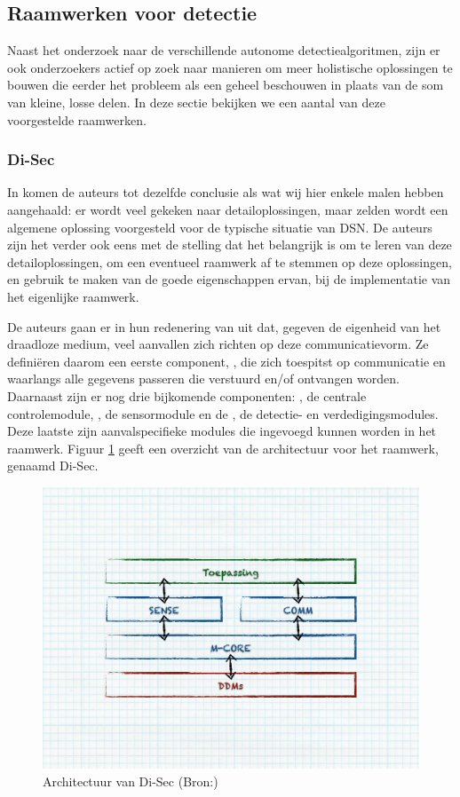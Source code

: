 
\subsection{Raamwerken voor detectie}
\label{subsection:frameworks}

Naast het onderzoek naar de verschillende autonome detectiealgoritmen, zijn er
ook onderzoekers actief op zoek naar manieren om meer holistische oplossingen
te bouwen die eerder het probleem als een geheel beschouwen in plaats van de
som van kleine, losse delen. In deze sectie bekijken we een aantal van deze
voorgestelde raamwerken.

\subsubsection*{Di-Sec}
\label{subsubsection:di-sec}

In \citep{valero2012di} komen de auteurs tot dezelfde conclusie als wat wij
hier enkele malen hebben aangehaald: er wordt veel gekeken naar
detailoplossingen, maar zelden wordt een algemene oplossing voorgesteld voor de
typische situatie van DSN. De auteurs zijn het verder ook eens met de stelling
dat het belangrijk is om te leren van deze detailoplossingen, om een eventueel
raamwerk af te stemmen op deze oplossingen, en gebruik te maken van de goede
eigenschappen ervan, bij de implementatie van het eigenlijke raamwerk.

De auteurs gaan er in hun redenering van uit dat, gegeven de eigenheid van het
draadloze medium, veel aanvallen zich richten op deze communicatievorm. Ze
defini\"eren daarom een eerste component, , die zich toespitst op
communicatie en waarlangs alle gegevens passeren die verstuurd en/of ontvangen
worden. Daarnaast zijn er nog drie bijkomende componenten: , de
centrale controlemodule, , de sensormodule en de , de
detectie- en verdedigingsmodules. Deze laatste zijn aanvalspecifieke modules
die ingevoegd kunnen worden in het raamwerk. Figuur
\ref{fig:di-sec-architecture} geeft een overzicht van de architectuur voor het
raamwerk, genaamd Di-Sec.

\begin{figure}[ht]
  \centering
  \includegraphics[width=0.8\linewidth]{resources/di-sec-architecture.pdf}
  \caption[Architectuur van Di-Sec]{Architectuur van Di-Sec (Bron:\citep{valero2012di})}
  \label{fig:di-sec-architecture}
\end{figure}


